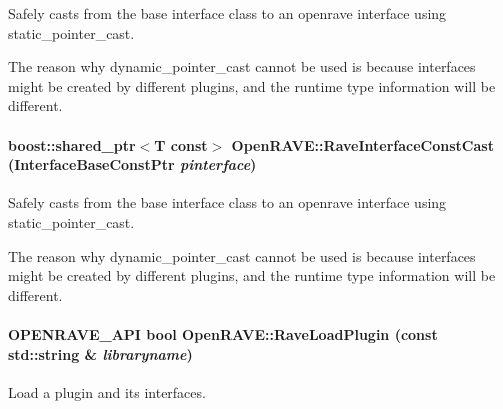 Safely casts from the base interface class to an openrave interface using static\_\-pointer\_\-cast. 

The reason why dynamic\_\-pointer\_\-cast cannot be used is because interfaces might be created by different plugins, and the runtime type information will be different. \hypertarget{namespaceOpenRAVE_adf731ae412bd36fe76b35c4e2e4f6478}{
\paragraph[{RaveInterfaceConstCast}]{\setlength{\rightskip}{0pt plus 5cm}boost::shared\_\-ptr$<$T const$>$ OpenRAVE::RaveInterfaceConstCast (InterfaceBaseConstPtr {\em pinterface})}\hfill}
\label{namespaceOpenRAVE_adf731ae412bd36fe76b35c4e2e4f6478}


Safely casts from the base interface class to an openrave interface using static\_\-pointer\_\-cast. 

The reason why dynamic\_\-pointer\_\-cast cannot be used is because interfaces might be created by different plugins, and the runtime type information will be different. \hypertarget{namespaceOpenRAVE_a6bca7a284a46924c61bcbdd37aeb3dcf}{
\paragraph[{RaveLoadPlugin}]{\setlength{\rightskip}{0pt plus 5cm}OPENRAVE\_\-API bool OpenRAVE::RaveLoadPlugin (const std::string \& {\em libraryname})}\hfill}
\label{namespaceOpenRAVE_a6bca7a284a46924c61bcbdd37aeb3dcf}


Load a plugin and its interfaces. 

